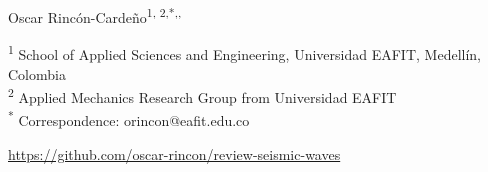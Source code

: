 \documentclass[11pt,twoside]{article}
\begin{document}
{\begin{center}
Oscar Rincón-Cardeño\textsuperscript{1, 2,*,\href{https://orcid.org/0000-0002-5308-9710}{\aiOrcid},
\href{https://github.com/oscar-rincon}{\faGithubSquare}}
\end{center}
}

\vspace{-0.3cm}

{\footnotesize
\noindent\textsuperscript{1} School of Applied Sciences and Engineering, Universidad EAFIT, 
Medellín, Colombia\\
\noindent\textsuperscript{2} Applied Mechanics Research Group from Universidad EAFIT\\
\noindent\textsuperscript{*} Correspondence: orincon@eafit.edu.co
}


{\noindent\footnotesize{\href{https://github.com/oscar-rincon/review-seismic-waves}
{\faGithubSquare \href{https://github.com/oscar-rincon/review-seismic-waves}{ https://github.com/oscar-rincon/review-seismic-waves}}
}
}


\end{document}
